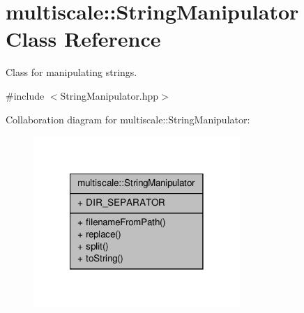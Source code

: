 \hypertarget{classmultiscale_1_1StringManipulator}{\section{multiscale\-:\-:String\-Manipulator Class Reference}
\label{classmultiscale_1_1StringManipulator}
}


Class for manipulating strings.  




{\ttfamily \#include $<$String\-Manipulator.\-hpp$>$}



Collaboration diagram for multiscale\-:\-:String\-Manipulator\-:
\nopagebreak
\begin{figure}[H]
\begin{center}
\leavevmode
\includegraphics[width=222pt]{classmultiscale_1_1StringManipulator__coll__graph}
\end{center}
\end{figure}
